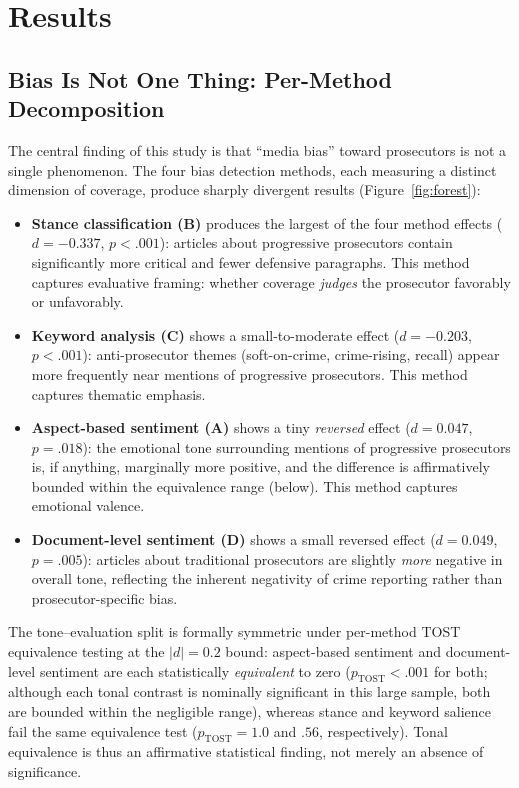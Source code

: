 \documentclass[12pt, letterpaper]{article}
\begin{document}
\section{Results}
\label{sec:results}

\subsection{Bias Is Not One Thing: Per-Method Decomposition}
\label{sec:permethod}

The central finding of this study is that ``media bias'' toward prosecutors is not a single phenomenon. The four bias detection methods, each measuring a distinct dimension of coverage, produce sharply divergent results (Figure~\ref{fig:forest}):

\begin{itemize}[nosep]
  \item \textbf{Stance classification (B)} produces the largest of the four method effects ($d = -0.337$, $p < .001$): articles about progressive prosecutors contain significantly more critical and fewer defensive paragraphs. This method captures evaluative framing: whether coverage \emph{judges} the prosecutor favorably or unfavorably.
  \item \textbf{Keyword analysis (C)} shows a small-to-moderate effect ($d = -0.203$, $p < .001$): anti-prosecutor themes (soft-on-crime, crime-rising, recall) appear more frequently near mentions of progressive prosecutors. This method captures thematic emphasis.
  \item \textbf{Aspect-based sentiment (A)} shows a tiny \emph{reversed} effect ($d = 0.047$, $p = .018$): the emotional tone surrounding mentions of progressive prosecutors is, if anything, marginally more positive, and the difference is affirmatively bounded within the equivalence range (below). This method captures emotional valence.
  \item \textbf{Document-level sentiment (D)} shows a small reversed effect ($d = 0.049$, $p = .005$): articles about traditional prosecutors are slightly \emph{more} negative in overall tone, reflecting the inherent negativity of crime reporting rather than prosecutor-specific bias.
\end{itemize}

The tone--evaluation split is formally symmetric under per-method TOST equivalence testing at the $|d| = 0.2$ bound: aspect-based sentiment and document-level sentiment are each statistically \emph{equivalent} to zero ($p_{\text{TOST}} < .001$ for both; although each tonal contrast is nominally significant in this large sample, both are bounded within the negligible range), whereas stance and keyword salience fail the same equivalence test ($p_{\text{TOST}} = 1.0$ and $.56$, respectively). Tonal equivalence is thus an affirmative statistical finding, not merely an absence of significance.
\end{document}
